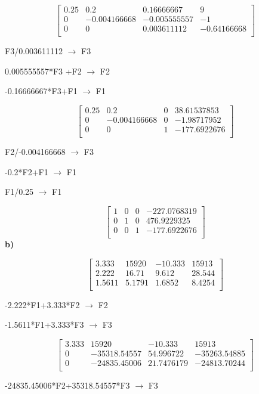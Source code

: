 \documentclass[12pt]{article}
\begin{document}
\[
\begin{bmatrix}
0.25 & 0.2 & 0.16666667 & 9 \\
0 & -0.004166668 & -0.005555557 & -1 \\
0 & 0 & 0.003611112 & -0.64166668 \\
\end{bmatrix}
\]

F3/0.003611112  $\longrightarrow $ F3

0.005555557*F3 +F2 $\longrightarrow $ F2

-0.16666667*F3+F1  $\longrightarrow $ F1

\[
\begin{bmatrix}
0.25 & 0.2 & 0 & 38.61537853 \\
0 & -0.004166668 & 0 & -1.98717952 \\
0 & 0 & 1 & -177.6922676\\
\end{bmatrix}
\]

F2/-0.004166668  $\longrightarrow $ F3

-0.2*F2+F1  $\longrightarrow $ F1

F1/0.25  $\longrightarrow $ F1

\[
\begin{bmatrix}
1 & 0 & 0 & -227.0768319 \\
0 & 1 & 0 & 476.9229325 \\
0 & 0 & 1 & -177.6922676\\
\end{bmatrix}
\]
\textbf{b)}

\[
\begin{bmatrix}
3.333 & 15920 & -10.333 & 15913\\
2.222 & 16.71 & 9.612 & 28.544 \\
1.5611 & 5.1791 & 1.6852 & 8.4254\\
\end{bmatrix}
\]

-2.222*F1+3.333*F2  $\longrightarrow $ F2

-1.5611*F1+3.333*F3 $\longrightarrow $ F3

\[
\begin{bmatrix}
3.333 & 15920 & -10.333 & 15913\\
0 & -35318.54557 & 54.996722 & -35263.54885 \\
0 & -24835.45006 & 21.7476179 & -24813.70244\\
\end{bmatrix}
\]

-24835.45006*F2+35318.54557*F3 $\longrightarrow $ F3
\end{document}
